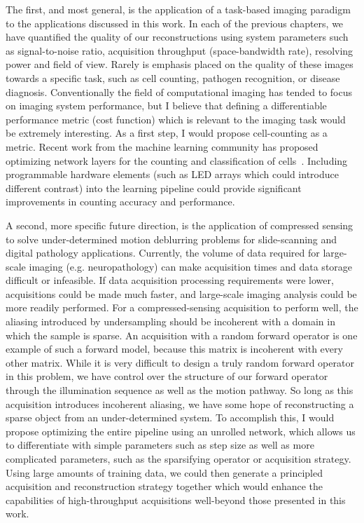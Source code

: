 The first, and most general, is the application of a task-based imaging paradigm to the applications discussed in this work. In each of the previous chapters, we have quantified the quality of our reconstructions using system parameters such as signal-to-noise ratio, acquisition throughput (space-bandwidth rate), resolving power and field of view. Rarely is emphasis placed on the quality of these images towards a specific task, such as cell counting, pathogen recognition, or disease diagnosis. Conventionally the field of computational imaging has tended to focus on imaging system performance, but I believe that defining a differentiable performance metric (cost function) which is relevant to the imaging task would be extremely interesting. As a first step, I would propose cell-counting as a metric. Recent work from the machine learning community has proposed optimizing network layers for the counting and classification of cells~\cite{falk2019unet, xue2017cell}. Including programmable hardware elements (such as LED arrays which could introduce different contrast) into the learning pipeline could provide significant improvements in counting accuracy and performance.

A second, more specific future direction, is the application of compressed sensing to solve under-determined motion deblurring problems for slide-scanning and digital pathology applications. Currently, the volume of data required for large-scale imaging (e.g. neuropathology) can make acquisition times and data storage difficult or infeasible. If data acquisition processing requirements were lower, acquisitions could be made much faster, and large-scale imaging analysis could be more readily performed. For a compressed-sensing acquisition to perform well, the aliasing introduced by undersampling should be incoherent with a domain in which the sample is sparse. An acquisition with a random forward operator is one example of such a forward model, because this matrix is incoherent with every other matrix. While it is very difficult to design a truly random forward operator in this problem, we have control over the structure of our forward operator through the illumination sequence as well as the motion pathway. So long as this acquisition introduces incoherent aliasing, we have some hope of reconstructing a sparse object from an under-determined system. To accomplish this, I would propose optimizing the entire pipeline using an unrolled network, which allows us to differentiate with simple parameters such as step size as well as more complicated parameters, such as the sparsifying operator or acquisition strategy. Using large amounts of training data, we could then generate a principled acquisition and reconstruction strategy together which would enhance the capabilities of high-throughput acquisitions well-beyond those presented in this work.

